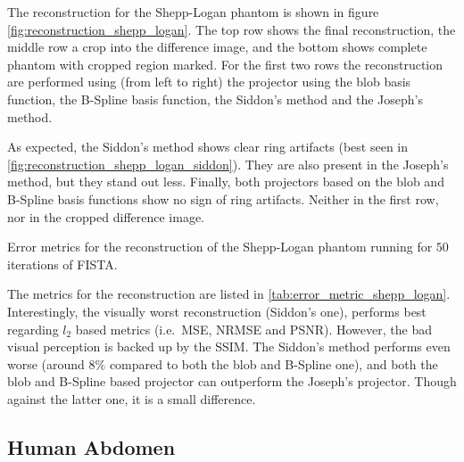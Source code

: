 The reconstruction for the Shepp-Logan phantom is shown in figure
\autoref{fig:reconstruction_shepp_logan}. The top row shows the final reconstruction, the middle row
a crop into the difference image, and the bottom shows complete phantom with cropped region marked.
For the first two rows the reconstruction are performed using (from left to right) the projector
using the blob basis function, the B-Spline basis function, the Siddon's method and the Joseph's
method.

As expected, the Siddon's method shows clear ring artifacts (best seen in
\autoref{fig:reconstruction_shepp_logan_siddon}). They are also present in the Joseph's method, but
they stand out less. Finally, both projectors based on the blob and B-Spline basis functions show no
sign of ring artifacts. Neither in the first row, nor in the cropped difference image.

\begin{table}[h]%
	\centering
	\caption{Error metrics for the reconstruction of the Shepp-Logan phantom running for \(50\)
		iterations of FISTA.}%
	\label{tab:error_metric_shepp_logan}
\end{table}

The metrics for the reconstruction are listed in \autoref{tab:error_metric_shepp_logan}.
Interestingly, the visually worst reconstruction (Siddon's one), performs best regarding \(l_2\)
based metrics (i.e.\ \gls{MSE}, \gls{NRMSE} and \gls{PSNR}). However, the bad visual perception is
backed up by the \gls{SSIM}. The Siddon's method performs even worse (around \(8\%\) compared to
both the blob and B-Spline one), and both the blob and B-Spline based projector can outperform the
Joseph's projector. Though against the latter one, it is a small difference.

\subsection{Human Abdomen}

